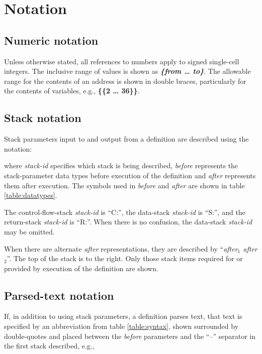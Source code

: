 \section{Notation} %

\subsection{Numeric notation}

Unless otherwise stated, all references to numbers apply to signed
single-cell integers. The inclusive range of values is shown as
\textit{\textbf{\{from {\ldots} to\}}}. The allowable range for the
contents of an address is shown in double braces, particularly for
the contents of variables, e.g., 
\textbf{\{\{2 {\ldots} 36\}\}}.

\subsection{Stack notation}

Stack parameters input to and output from a definition are described
using the notation:
\begin{quote}
\end{quote}

where \emph{stack-id} specifies which stack is being described,
\emph{before} represents the stack-parameter data types before
execution of the definition and \emph{after} represents them
after execution. The symbols used in \emph{before} and \emph{after}
are shown in table \ref{table:datatypes}.

The control-flow-stack \emph{stack-id} is ``C:'', the data-stack
\emph{stack-id} is ``S:'', and the return-stack \emph{stack-id}
is ``R:''. When there is no confusion, the data-stack
\emph{stack-id} may be omitted.

When there are alternate \emph{after} representations, they are
described by ``\emph{after$_1$ \textbar{} after$_2$}''. The top of
the stack is to the right. Only those stack items required for or
provided by execution of the definition are shown.


\subsection{Parsed-text notation}

If, in addition to using stack parameters, a definition parses text,
that text is specified by an abbreviation from table \ref{table:syntax},
shown surrounded by double-quotes and placed between the \emph{before}
parameters and the ``--'' separator in the first stack described, e.g.,

